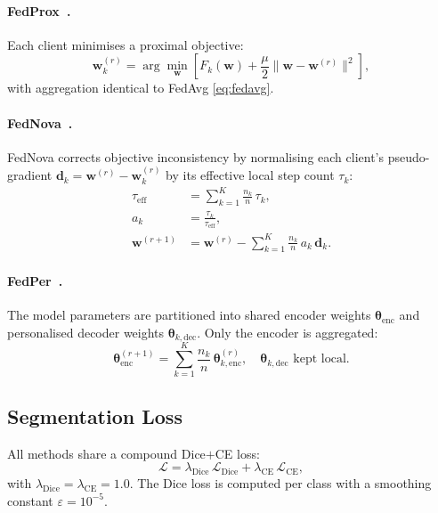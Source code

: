 \paragraph{FedProx~\cite{li2020fedprox}.}
Each client minimises a proximal objective:
\begin{equation}
  \mathbf{w}_k^{(r)} = \arg\min_{\mathbf{w}}
  \left[ F_k(\mathbf{w}) + \frac{\mu}{2}\|\mathbf{w} - \mathbf{w}^{(r)}\|^2 \right],
  \label{eq:fedprox}
\end{equation}
with aggregation identical to FedAvg \eqref{eq:fedavg}.

\paragraph{FedNova~\cite{wang2020fednova}.}
FedNova corrects objective inconsistency by normalising each client's
pseudo-gradient $\mathbf{d}_k = \mathbf{w}^{(r)} - \mathbf{w}_k^{(r)}$ by
its effective local step count $\tau_k$:
\begin{align}
  \tau_{\text{eff}} &= \sum_{k=1}^{K} \frac{n_k}{n}\,\tau_k, \\
  a_k &= \frac{\tau_k}{\tau_{\text{eff}}},  \\
  \mathbf{w}^{(r+1)} &= \mathbf{w}^{(r)}
    - \sum_{k=1}^{K} \frac{n_k}{n}\,a_k\,\mathbf{d}_k.
  \label{eq:fednova}
\end{align}

\paragraph{FedPer~\cite{arivazhagan2019fedper}.}
The model parameters are partitioned into shared encoder weights
$\boldsymbol{\theta}_{\text{enc}}$ and personalised decoder weights
$\boldsymbol{\theta}_{k,\text{dec}}$.
Only the encoder is aggregated:
\begin{equation}
  \boldsymbol{\theta}_{\text{enc}}^{(r+1)} =
    \sum_{k=1}^{K} \frac{n_k}{n}\,\boldsymbol{\theta}_{k,\text{enc}}^{(r)},
  \quad
  \boldsymbol{\theta}_{k,\text{dec}} \text{ kept local.}
  \label{eq:fedper}
\end{equation}

\subsection{Segmentation Loss}

All methods share a compound Dice$+$CE loss:
\begin{equation}
  \mathcal{L} = \lambda_{\text{Dice}}\,\mathcal{L}_{\text{Dice}}
              + \lambda_{\text{CE}}\,\mathcal{L}_{\text{CE}},
  \label{eq:loss}
\end{equation}
with $\lambda_{\text{Dice}} = \lambda_{\text{CE}} = 1.0$.
The Dice loss is computed per class with a smoothing constant $\varepsilon=10^{-5}$.

